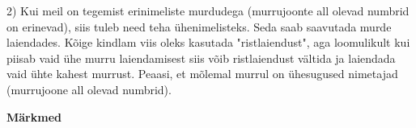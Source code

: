 2) Kui meil on tegemist erinimeliste murdudega (murrujoonte all olevad numbrid on erinevad), siis tuleb need teha ühenimelisteks. Seda saab saavutada murde laiendades. Kõige kindlam viis oleks kasutada "ristlaiendust", aga loomulikult kui piisab vaid ühe murru laiendamisest siis võib ristlaiendust vältida ja laiendada vaid ühte kahest murrust. Peaasi, et mõlemal murrul on ühesugused nimetajad (murrujoone all olevad numbrid).\\

\vspace{1.5cm}

\textbf{Märkmed}\\
\vspace{2mm}
\begin{mdframed}[style=graphpaper]
\vspace{15cm}
\end{mdframed}
